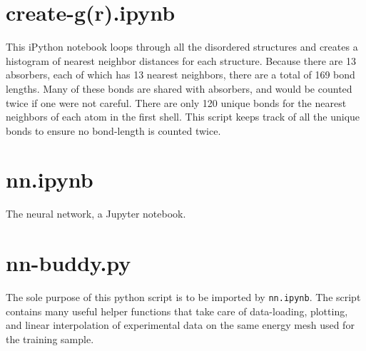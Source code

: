 \section{create-g(r).ipynb}

This iPython notebook loops through all the disordered structures and creates a histogram of nearest neighbor distances for each structure. Because there are 13 absorbers, each of which has 13 nearest neighbors, there are a total of 169 bond lengths. Many of these bonds are shared with absorbers, and would be counted twice if one were not careful. There are only 120 unique bonds for the nearest neighbors of each atom in the first shell. This script keeps track of all the unique bonds to ensure no bond-length is counted twice.

\section{nn.ipynb}
The neural network, a Jupyter notebook.

\section{nn-buddy.py}
The sole purpose of this python script is to be imported by \texttt{nn.ipynb}. The script contains many useful helper functions that take care of data-loading, plotting, and linear interpolation of experimental data on the same energy mesh used for the training sample.
